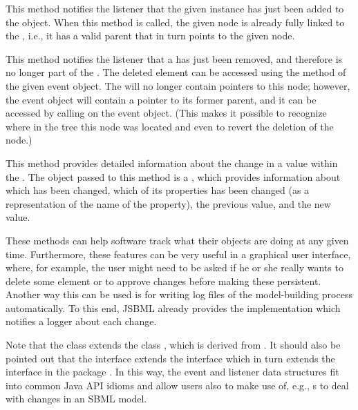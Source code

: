 \begin{description}[font=\normalfont]

\item[\code{nodeAdded(TreeNode node)}:] This method notifies the listener
  that the given \TreeNode instance has just been added to the \SBMLDocument
  object. When this method is called, the given node is already fully linked
  to the \SBMLDocument, i.e., it has a valid parent that in turn points to
  the given node.

\item[\code{nodeRemoved(TreeNodeRemoveEvent evt)}:] This method notifies the listener
  that a \TreeNode has just been removed, and therefore is
  no longer part of the \SBMLDocument. The deleted element can be accessed 
  using the  method of the given event object. The 
  \SBMLDocument will no longer contain
  pointers to this node; however, the event object will contain
  a pointer to its former parent, and it can be accessed by calling 
  on the event object. (This makes it possible to recognize where
  in the tree this node was located and even to revert the deletion of the
  node.)

\item[\code{propertyChange(PropertyChangeEvent evt)}:] This method
  provides detailed information about the change in a value within the
  \SBMLDocument.  The object passed to this method is a
  \TreeNodeChangeEvent, which provides information about which \TreeNode
  has been changed, which of its properties has been changed (as a
  \String representation of the name of the property), the previous value,
  and the new value.

\end{description}

These methods can help software track what their \SBMLDocument objects are
doing at any given time.  Furthermore, these features can be very useful in
a graphical user interface, where, for
example, the user might need to be asked if he or she really wants to
delete some element or to approve changes before making these
persistent. Another way this can be used is for writing log
files of the model-building  process
automatically. To this end, JSBML already provides the implementation
\SimpleTreeNodeChangeListener which notifies a logger about each change.

Note that the class \TreeNodeChangeEvent extends the class
,
 which is
derived from
.
It should also be pointed out that the interface \TreeNodeChangeListener
extends the interface 
 which in
turn extends the interface \EventListener in the package
. In this way, the event and listener data structures fit
into common Java API idioms 
and allow users also to make use of, e.g., \EventHandler{}s to deal with
changes in an SBML model.

